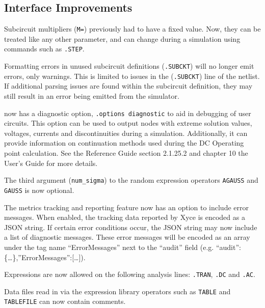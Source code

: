 \documentclass[letterpaper]{scrartcl}
\begin{document}
\subsection*{Interface Improvements}
\begin{XyceItemize}
\item Subcircuit multipliers (\texttt{M=}) previously had to have a fixed value.
  Now, they can be treated like any other parameter, and can change during a simulation
  using commands such as \texttt{.STEP}.

\item Formatting errors in unused subcircuit definitions (\texttt{.SUBCKT}) will no
  longer emit errors, only warnings.  This is limited to issues in the (\texttt{.SUBCKT})
  line of the netlist.  If additional parsing issues are found within the subcircuit
  definition, they may still result in an error being emitted from the simulator.

\item \Xyce{} now has a diagnostic option, \texttt{.options diagnostic} to aid in
  debugging of user circuits.  This option can be used to output nodes with extreme
  solution values, voltages, currents and discontinuities during a simulation.
  Additionally, it can provide information on continuation methods used during
  the DC Operating point calculation.  See the Reference Guide section 2.1.25.2
  and chapter 10 the User's Guide for more details.

\item The third argument (\texttt{num\_sigma}) to the random expression
     operators \texttt{AGAUSS} and \texttt{GAUSS} is now optional.

\item The metrics tracking and reporting feature now has an option to include
  error messages. When enabled, the tracking data reported by Xyce is encoded as
  a JSON string. If certain error conditions occur, the JSON string may now
  include a list of diagnostic messages. These error messages will be encoded as
  an array under the tag name “ErrorMessages” next to the “audit” field
  (e.g. {“audit”:\{\dots\},”ErrorMessages”:[\dots]}).

\item Expressions are now allowed on the following analysis lines:
     \texttt{.TRAN}, \texttt{.DC} and \texttt{.AC}.

\item Data files read in via the expression library operators such as
     \texttt{TABLE} and \texttt{TABLEFILE} can now contain comments.


\end{XyceItemize}
\end{document}
